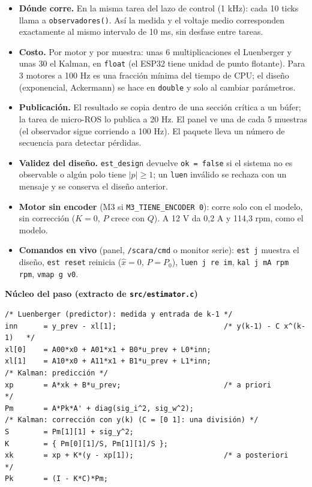\documentclass[11pt]{article}
\newcommand{\cod}[1]{\texttt{#1}}
\begin{document}
\begin{itemize}
  \item \textbf{Dónde corre.} En la misma tarea del lazo de control (1 kHz): cada 10 ticks llama a \cod{observadores()}. Así la medida y el voltaje medio corresponden exactamente al mismo intervalo de 10 ms, sin desfase entre tareas.
  \item \textbf{Costo.} Por motor y por muestra: unas 6 multiplicaciones el Luenberger y unas 30 el Kalman, en \cod{float} (el ESP32 tiene unidad de punto flotante). Para 3 motores a 100 Hz es una fracción mínima del tiempo de CPU; el diseño (exponencial, Ackermann) se hace en \cod{double} y solo al cambiar parámetros.
  \item \textbf{Publicación.} El resultado se copia dentro de una sección crítica a un búfer; la tarea de micro-ROS lo publica a 20 Hz. El panel ve una de cada 5 muestras (el observador sigue corriendo a 100 Hz). El paquete lleva un número de secuencia para detectar pérdidas.
  \item \textbf{Validez del diseño.} \cod{est\_design} devuelve \cod{ok = false} si el sistema no es observable o algún polo tiene $|p|\ge1$; un \cod{luen} inválido se rechaza con un mensaje y se conserva el diseño anterior.
  \item \textbf{Motor sin encoder} (M3 si \cod{M3\_TIENE\_ENCODER 0}): corre solo con el modelo, sin corrección ($K=0$, $P$ crece con $Q$). A 12 V da 0,2 A y 114,3 rpm, como el modelo.
  \item \textbf{Comandos en vivo} (panel, \cod{/scara/cmd} o monitor serie): \cod{est j} muestra el diseño, \cod{est reset} reinicia ($\hat x=0$, $P=P_0$), \cod{luen j re im}, \cod{kal j mA rpm rpm}, \cod{vmap g v0}.
\end{itemize}

\textbf{Núcleo del paso (extracto de \cod{src/estimator.c})}
\begin{Verbatim}[fontsize=\footnotesize, frame=single, rulecolor=\color{azul!50}]
/* Luenberger (predictor): medida y entrada de k-1 */
inn      = y_prev - xl[1];                         /* y(k-1) - C x^(k-1)   */
xl[0]    = A00*x0 + A01*x1 + B0*u_prev + L0*inn;
xl[1]    = A10*x0 + A11*x1 + B1*u_prev + L1*inn;
/* Kalman: predicción */
xp       = A*xk + B*u_prev;                        /* a priori             */
Pm       = A*Pk*A' + diag(sig_i^2, sig_w^2);
/* Kalman: corrección con y(k) (C = [0 1]: una división) */
S        = Pm[1][1] + sig_y^2;
K        = { Pm[0][1]/S, Pm[1][1]/S };
xk       = xp + K*(y - xp[1]);                     /* a posteriori         */
Pk       = (I - K*C)*Pm;
\end{Verbatim}
\end{document}
